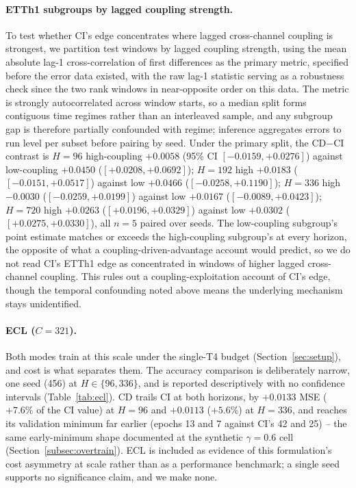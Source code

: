 \documentclass[10pt]{article} %
\begin{document}
    \paragraph{ETTh1 subgroups by lagged coupling strength.} To test whether CI's edge concentrates where lagged cross-channel
    coupling is strongest, we partition test windows by lagged coupling strength, using the mean absolute lag-1 cross-correlation
    of first differences as the primary metric, specified before the error data existed, with the raw lag-1 statistic serving
    as a robustness check since the two rank windows in near-opposite order on this data. The metric is strongly autocorrelated
    across window starts, so a median split forms contiguous time regimes rather than an interleaved sample, and any subgroup
    gap is therefore partially confounded with regime; inference aggregates errors to run level per subset before pairing by
    seed. Under the primary split, the CD$-$CI contrast is $H=96$ high-coupling $+0.0058$ (95\% CI $[-0.0159, +0.0276]$) against
    low-coupling $+0.0450$ ($[+0.0208, +0.0692]$); $H=192$ high $+0.0183$ ($[-0.0151, +0.0517]$) against low $+0.0466$
    ($[-0.0258, +0.1190]$); $H=336$ high $-0.0030$ ($[-0.0259, +0.0199]$) against low $+0.0167$ ($[-0.0089, +0.0423]$);
    $H=720$ high $+0.0263$ ($[+0.0196, +0.0329]$) against low $+0.0302$ ($[+0.0275, +0.0330]$), all $n=5$ paired over seeds.
    The low-coupling subgroup's point estimate matches or exceeds the high-coupling subgroup's at every horizon, the opposite
    of what a coupling-driven-advantage account would predict, so we do not read CI's ETTh1 edge as concentrated in windows
    of higher lagged cross-channel coupling. This rules out a coupling-exploitation account of CI's edge, though the temporal
    confounding noted above means the underlying mechanism stays unidentified.

    \paragraph{ECL ($C = 321$).} Both modes train at this scale under the single-T4 budget (Section~\ref{sec:setup}), and
    cost is what separates them. The accuracy comparison is deliberately narrow, one seed (456) at $H \in \{96, 336\}$, and is
    reported descriptively with no confidence intervals (Table~\ref{tab:ecl}). CD trails CI at both horizons, by $+0.0133$
    MSE ($+7.6\%$ of the CI value) at $H = 96$ and $+0.0113$ ($+5.6\%$) at $H = 336$, and reaches its validation minimum
    far earlier (epochs 13 and 7 against CI's 42 and 25) -- the same early-minimum shape documented at the synthetic
    $\gamma = 0.6$ cell (Section~\ref{subsec:overtrain}). ECL is included as evidence of this formulation's cost asymmetry
    at scale rather than as a performance benchmark; a single seed supports no significance claim, and we make none.
\end{document}
